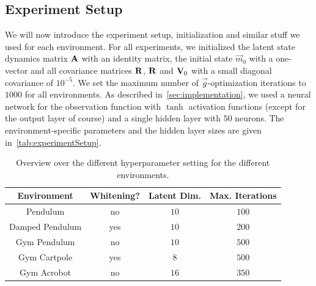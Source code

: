 	\subsection{Experiment Setup}
		We will now introduce the experiment setup, initialization and similar stuff we used for each environment. For all experiments, we initialized the latent state dynamics matrix \( \boldsymbol{\mathrm{A}} \) with an identity matrix, the initial state \( \vec{m}_0 \) with a one-vector and all covariance matrices \( \boldsymbol{\mathrm{R}} \), \( \boldsymbol{\mathrm{R}} \) and \( \boldsymbol{\mathrm{V}}_0 \) with a small diagonal covariance of \( 10^{-5} \). We set the maximum number of \(\vec{g}\)-optimization iterations to \(1000\) for all environments. As described in~\autoref{sec:implementation}, we used a neural network for the observation function with \(\tanh\) activation functions (except for the output layer of course) and a single hidden layer with \(50\) neurons. The environment-specific parameters and the hidden layer sizes are given in~\autoref{tab:experimentSetup}.

		\begin{table}
			\centering
			\begin{tabular}{c|ccc}
				\textbf{Environment} & \textbf{Whitening?} & \textbf{Latent Dim.} & \textbf{Max. Iterations} \\ \hline
				      Pendulum       &         no          &        \(10\)        &         \(100\)          \\
				  Damped Pendulum    &         yes         &        \(10\)        &         \(200\)          \\
				    Gym Pendulum     &         no          &        \(10\)        &         \(500\)          \\
				    Gym Cartpole     &         yes         &        \(8\)         &         \(500\)          \\
				    Gym Acrobot      &         no          &        \(16\)        &         \(350\)
			\end{tabular}
			\caption{Overview over the different hyperparameter setting for the different environments.}
			\label{tab:experimentSetup}
		\end{table}

